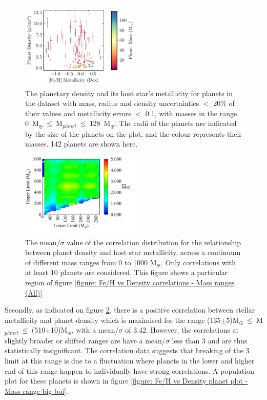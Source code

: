 \documentclass[a4paper,twocolumn,12pt]{article}
\begin{document}
\begin{figure}[h!]
    \centering
    \includegraphics[width=0.5\textwidth]{Graphs/FeH vs Density Planet Plot Mass 0 to 128.pdf}
    \caption{The planetary density and its host star's metallicity for planets in the dataset with mass, radius and density uncertainties $<$ 20\% of their values and metallicity errors $<$ 0.1, with masses in the range 0~M$_{\oplus}~\leq~$M$_{planet}~\leq~$128~M$_{\oplus}$. The radii of the planets are indicated by the size of the planets on the plot, and the colour represents their masses. 142 planets are shown here.}
    \label{figure: Fe/H vs Density planet plot - Small masses}
\end{figure}


\begin{figure}[h!]
    \centering
    \includegraphics[width=0.51\textwidth]{Graphs/FeH vs Density correlations - Mass ranges (0 to 1000).pdf}
    \caption{The mean/$\sigma$ value of the correlation distribution for the relationship between planet density and host star metallicity, across a continuum of different mass ranges from 0 to 1000 M$_\oplus$. Only correlations with at least 10 planets are considered. This figure shows a particular region of figure \ref{figure: Fe/H vs Density correlations - Mass ranges (All)}}
    \label{figure: Fe/H vs Density correlations - Mass ranges (0 to 1000)}
\end{figure}

Secondly, as indicated on figure \ref{figure: Fe/H vs Density correlations - Mass ranges (0 to 1000)}, there is a positive correlation between stellar metallicity and planet density which is maximised for the range (135$\pm$5)M$_{\oplus}~\leq~$M$_{planet}~\leq~$(510$\pm$10)M$_{\oplus}$, with a mean/$\sigma$ of 3.42. However, the correlations at slightly broader or shifted ranges are have a mean/$\sigma$ less than 3 and are thus statistically insignificant. The correlation data suggests that breaking of the 3 limit at this range is due to a fluctuation where planets in the lower and higher end of this range happen to individually have strong correlations. A population plot for these planets is shown in figure \ref{figure: Fe/H vs Density planet plot - Mass range big boi}.
\end{document}
